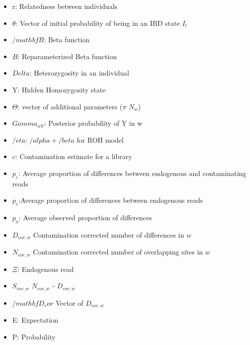 \documentclass[12pt, letterpaper]{article}
\begin{document}
\begin{itemize}
\item r: Relatedness between individuals
\item $\theta$: Vector of initial probability of being in an IBD state $I_l$
\item $/mathbf{B}$: Beta function
\item $B$: Reparameterized Beta function
\item $Delta$: Heterozygosity in an individual
\item Y: Hidden Homozygosity state
\item $\Theta$: vector of additional parameters ($\pi$ $N_w$)
\item $Gamma_{wY}$: Posterior probability of Y in w
\item $/eta$: $/alpha + /beta$ for ROH model
\item $c$: Contamination estimate for a library
\item $p_c$: Average proportion of differences between endogenous and contaminating reads
\item $p_e$:Average proportion of differences between endogenous reads
\item $p_a$: Average observed proportion of differences
\item $D_{cor,w}$ Contamination corrected number of differences in $w$
\item $N_{cor,w}$ Contamination corrected number of overlapping sites in $w$
\item $\Xi$: Endogenous read
\item $S_{cor,w}$ $N_{cor,w}$ - $D_{cor,w}$
\item $/mathbf{D_cor}$ Vector of $D_{cor,w}$ 
\item E: Expectation
\item P: Probability
\end{itemize}
\end{document}
